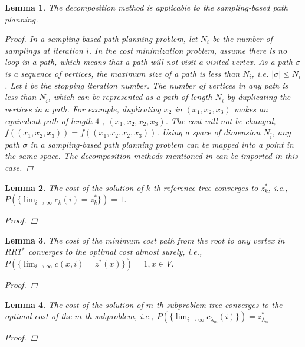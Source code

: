 \documentclass[conference]{IEEEtran}
\newtheorem{lem}{Lemma}
\theoremstyle{definition}
\begin{document}
\begin{lem}
\label{lem:moo-d:rrt}
The decomposition method is applicable to the sampling-based path planning.
\begin{proof}
In a sampling-based path planning problem, let $ N_{i} $ be the number of samplings at iteration $ i $.
In the cost minimization problem, assume there is no loop in a path, which means that a path will not visit a visited vertex.
As a path $ \sigma $ is a sequence of vertices, the maximum size of a path is less than $ N_{i} $, i.e.
$ | \sigma | \leq N_{i} $.
Let $ \bar{i} $ be the stopping iteration number.
The number of vertices in any path is less than $ N_{ \bar{i} } $, which can be represented as a path of length $ N_{ \bar{i} } $ by duplicating the vertices in a path.
For example, duplicating $ x_{2} $ in $ (x_{1} , x_{2}, x_{3} ) $ makes an equivalent path of length $ 4 $ , $ (x_{1} , x_{2},  x_{2}, x_{3} ) $.
The cost will not be changed, $ f( (x_{1} , x_{2}, x_{3}) ) = f( (x_{1} , x_{2},  x_{2}, x_{3} ) )$.
Using a space of dimension $ N_{ \bar{i} } $, any path $ \sigma $ in a sampling-based path planning problem can be mapped into a point in the same space.
The decomposition methods mentioned in \cite{4358754} can be imported in this case.		
\end{proof}
\end{lem}

\begin{lem}
\label{lem:ref_tree:conv}
The cost of the solution of $ k $-th reference tree converges to $ z^{*}_{k} $, i.e., 
$ P( \{ \lim_{ i \rightarrow \infty }  c_{k} ( i ) = z^{*}_{k}  \} ) = 1  $.
\begin{proof}

\end{proof}
\end{lem}

\begin{lem}
\label{lem:tree_vex:conv}
The cost of the minimum cost path from the root to any vertex in RRT$^{*}$ converges to the optimal cost almost surely, i.e.,
$
P( \{ \lim_{ i \rightarrow \infty } c(x, i)  = z^{*}(x) \} ) = 1, x \in V $.
\begin{proof}
\end{proof}
\end{lem}

\begin{lem}
\label{lem:sub_tree:conv}
The cost of the solution of $ m $-th subproblem tree converges to the optimal cost of the $ m $-th subproblem, i.e.,
$
P( \{ \lim_{ i \rightarrow \infty } c_{ \lambda_{m} }( i ) \} ) = z^{*}_{ \lambda_{m} }
$
\begin{proof}
\end{proof}
\end{lem}
\end{document}
